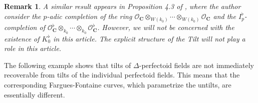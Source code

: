 \documentclass[12pts,a4paper]{amsart}
\newtheorem{remark}[proposition]{Remark}
\DeclareMathOperator{\C}{\textbf{C}}
\begin{document}
\begin{remark}
   A similar result appears in Proposition 4.3 of \cite{Bri}, where the author consider the $p$-adic completion of the ring $\mathcal{O}_{\C} \otimes_{W(k_0)} \cdots \otimes_{W(k_0)} \mathcal{O}_{\C}$ and the $I^\flat_p$-completion of $\mathcal{O}^\flat_{\C} \otimes_{k_0} \cdots \otimes_{k_0} \mathcal{O}^\flat_{\C}$. However, we will not be concerned with the existence of $K^{\flat}_0$ in this article. The explicit structure of the Tilt will not play a role in this article.
\end{remark}

The following example shows that tilts of $\Delta$-perfectoid fields are not immediately recoverable from tilts of the individual perfectoid fields. This means that the corresponding Fargues-Fontaine curves, which parametrize the untilts, are essentially different.
\end{document}
